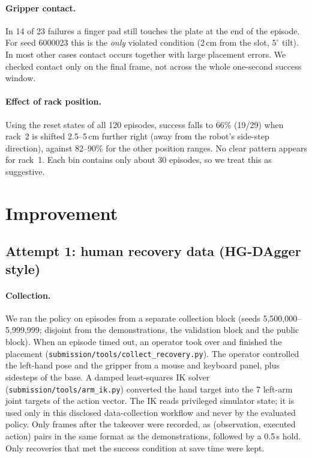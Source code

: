 \documentclass[11pt,a4paper]{article}
\begin{document}
\paragraph{Gripper contact.} In 14 of 23 failures a finger pad still
touches the plate at the end of the episode. For seed 6000023 this is the
\emph{only} violated condition (2\,cm from the slot, $5^\circ$ tilt). In
most other cases contact occurs together with large placement errors. We checked
contact only on the final frame, not across the whole one-second success window.

\paragraph{Effect of rack position.} Using the reset states of all 120
episodes, success falls to 66\% (19/29) when rack~2 is shifted
2.5--5\,cm further right (away from the robot's side-step direction),
against 82--90\% for the other position ranges. No clear pattern appears
for rack~1. Each bin contains only about 30 episodes, so we treat this as
suggestive.

\section{Improvement}
\label{sec:improvement}

\subsection{Attempt 1: human recovery data (HG-DAgger style)}
\label{sec:recovery}

\paragraph{Collection.} {\sloppy We ran the policy on episodes from a separate
collection block (seeds 5{,}500{,}000--5{,}999{,}999; disjoint from the
demonstrations, the validation block and the public block). When an episode
timed out, an operator took over and finished the placement
(\texttt{submission/tools/collect\_recovery.py}). The operator controlled the
left-hand pose and the gripper from a mouse and keyboard panel, plus
sidesteps of the base. A damped least-squares IK solver
(\texttt{submission/tools/arm\_ik.py}) converted the hand target into the 7
left-arm joint targets of the action vector. The IK reads privileged
simulator state; it is used only in this disclosed data-collection workflow
and never by the evaluated policy. Only frames after the takeover were
recorded, as (observation, executed action) pairs in the same format as the
demonstrations, followed by a 0.5\,s hold. Only recoveries that met the
success condition at save time were kept.\par}
\end{document}
